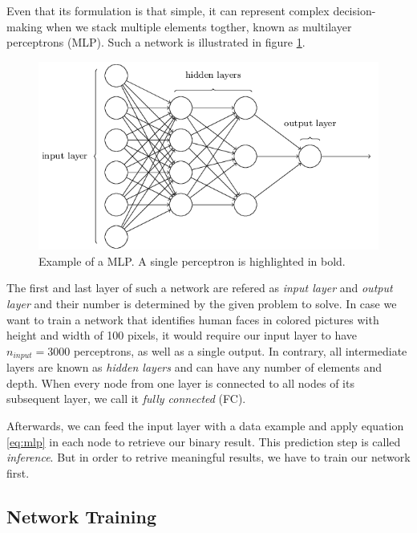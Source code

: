 Even that its formulation is that simple, it can represent complex decision-making when we stack multiple elements togther, known as multilayer perceptrons (MLP). Such a network is illustrated in figure \ref{fig:mlp}.

\begin{figure}[htpb]
	\centering
	\includegraphics[scale=0.35]{figures/mlp.png} %
	\caption[Multilayer perceptron]{Example of a MLP. A single perceptron is highlighted in bold.} \label{fig:mlp}
\end{figure}

The first and last layer of such a network are refered as \textit{input layer} and \textit{output layer} and their number is determined by the given problem to solve. In case we want to train a network that identifies human faces in colored pictures with height and width of 100 pixels, it would require our input layer to have $ n_{input}=3000 $ perceptrons, as well as a single output. In contrary, all intermediate layers are known as \textit{hidden layers} and can have any number of elements and depth. When every node from one layer is connected to all nodes of its subsequent layer, we call it \textit{fully connected} (FC).

Afterwards, we can feed the input layer with a data example and apply equation \ref{eq:mlp} in each node to retrieve our binary result. This prediction step is called \textit{inference}. But in order to retrive meaningful results, we have to train our network first.

\subsection{Network Training}


